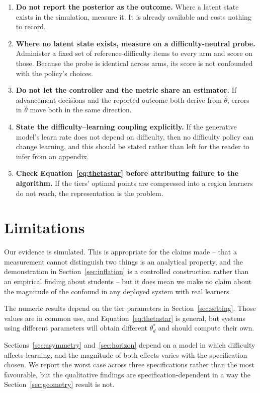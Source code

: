 \documentclass[notitlepage,12pt]{jedm}
\begin{document}
\begin{enumerate}
\item \textbf{Do not report the posterior as the outcome.} Where a latent state exists in the simulation, measure it. It is already available and costs nothing to record.
\item \textbf{Where no latent state exists, measure on a difficulty-neutral probe.} Administer a fixed set of reference-difficulty items to every arm and score on those. Because the probe is identical across arms, its score is not confounded with the policy's choices.
\item \textbf{Do not let the controller and the metric share an estimator.} If advancement decisions and the reported outcome both derive from $\hat{\theta}$, errors in $\hat{\theta}$ move both in the same direction.
\item \textbf{State the difficulty--learning coupling explicitly.} If the generative model's learn rate does not depend on difficulty, then no difficulty policy can change learning, and this should be stated rather than left for the reader to infer from an appendix.
\item \textbf{Check Equation~\ref{eq:thetastar} before attributing failure to the algorithm.} If the tiers' optimal points are compressed into a region learners do not reach, the representation is the problem.
\end{enumerate}

\section{Limitations}

Our evidence is simulated. This is appropriate for the claims made -- that a measurement cannot distinguish two things is an analytical property, and the demonstration in Section~\ref{sec:inflation} is a controlled construction rather than an empirical finding about students -- but it does mean we make no claim about the magnitude of the confound in any deployed system with real learners.

The numeric results depend on the tier parameters in Section~\ref{sec:setting}. Those values are in common use, and Equation~\ref{eq:thetastar} is general, but systems using different parameters will obtain different $\theta^{*}_d$ and should compute their own.

Sections~\ref{sec:asymmetry} and~\ref{sec:horizon} depend on a model in which difficulty affects learning, and the magnitude of both effects varies with the specification chosen. We report the worst case across three specifications rather than the most favourable, but the qualitative findings are specification-dependent in a way the Section~\ref{sec:geometry} result is not.
\end{document}
